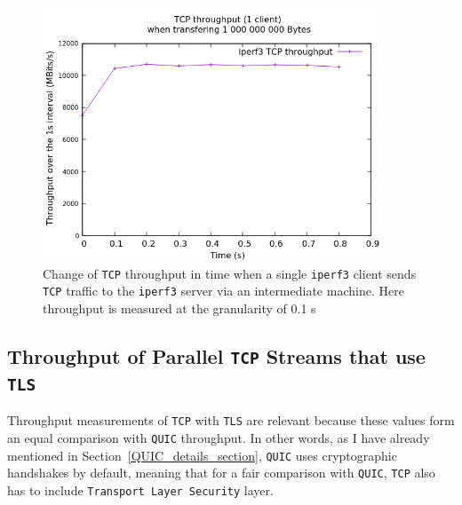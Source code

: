 \documentclass[12pt,a4paper,twoside,openright]{report}
\newcommand\note[2]{{\color{#1}\bf #2}}
\newcommand\simon[1]{\ifcomments{\note{cyan}{SM: #1}}\fi}
\begin{document}
    \begin{figure}[H]
    \centering
    \includegraphics[width=0.9\textwidth]{figs/TCP_throughput_in_time.png}
    \caption[Change of \texttt{TCP} throughput in time when a single \texttt{iperf3} client sends \texttt{TCP} traffic to the \texttt{iperf3} server via an intermediate machine]{Change of \texttt{TCP} throughput in time when a single \texttt{iperf3} client sends \texttt{TCP} traffic to the \texttt{iperf3} server via an intermediate machine. Here throughput is measured at the granularity of 0.1 s}
    \label{fig:TCP_throughput_in_time}
    \end{figure}
    
    
    
    
    

\subsection{Throughput of Parallel \texttt{TCP} Streams that use \texttt{TLS}}
 
Throughput measurements of \texttt{TCP} with \texttt{TLS} are relevant because these values form an equal comparison with \texttt{QUIC} throughput.
In other words, as I have already mentioned in Section~\ref{QUIC_details_section}, \texttt{QUIC} uses cryptographic handshakes by default, meaning that for a fair comparison with \texttt{QUIC}, \texttt{TCP} also has to include \texttt{Transport Layer Security} layer.
\end{document}
